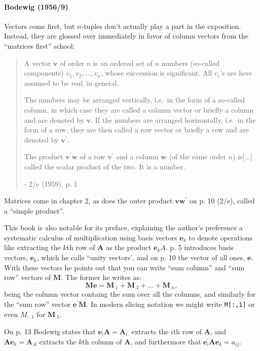 \paragraph{Bodewig (1956/9)~\cite{Bodewig1956}}

Vectors come first, but $n$-tuples don't actually play a part in the exposition.
Instead, they are glossed over immediately in favor of column vectors from the
``matrices first'' school:

\begin{quote}
A vector $\mathbf v$ of order $n$ is an ordered set of $n$ numbers (so-called
components) $v_1, v_2, \dots, v_n$, whose succession is significant. All $v_i$'s are here
assumed to be \textit{real}, in general.

The numbers may be arranged vertically, i.e.\ in the form of a so-called
column, in which case they are called a column vector or briefly a
column and are denoted by $\mathbf v$. If the numbers are arranged horizontally,
i.e.\ in the form of a row, they are then called a row vector or briefly a
row and are denoted by $\mathbf v^\prime$.

The product $\mathbf v^\prime \mathbf w$ of a row $\mathbf v^\prime$ and a column
$\mathbf w$ (of the same order $n$) is[...] called the scalar product of the two. It is a number.

- 2/e (1959), p. 1
\end{quote}

Matrices come in chapter 2, as does the outer product $\mathbf v \mathbf w^\prime$
on p. 10 (2/e), called a ``simple product''.

This book is also notable for its preface, explaining the author's preference a
systematic calculus of multiplication using basis vectors $\mathbf e_k$ to denote
operations like extracting the $k$th row of $\mathbf A$ as the product $\mathbf e_k A$.
p. 5 introduces basis vectors, $\mathbf e_k$, which he calls ``unity vectors',
and on p. 10 the vector of all ones, $\mathbf e$. With these vectors he points
out that you can write ``sum column'' and ``sum row'' vectors of $\mathbf M$. The
former he writes as:
\[
\mathbf{Me} = \mathbf M_{.1} + \mathbf M_{.2} + \dots + \mathbf M_{.n},
\]
being the column vector containg the sum over all the columns, and similarly for
the ``sum row'' vector $\mathbf{e^\prime M}$. In modern slicing notation we might
write \verb|M[:,1]| or even $M_{:,1}$ for $\mathbf M_{.1}$.

On p. 13 Bodewig states that $\mathbf e^\prime_i \mathbf A = \mathbf A_{i.}$
extracts the $i$th row of $\mathbf A$, and $\mathbf A \mathbf e_k = \mathbf A_{.k}$
extracts the $k$th column of $\mathbf A$, and furthermore that
$\mathbf e^\prime_i \mathbf A \mathbf e_k = a_{ij}$.

